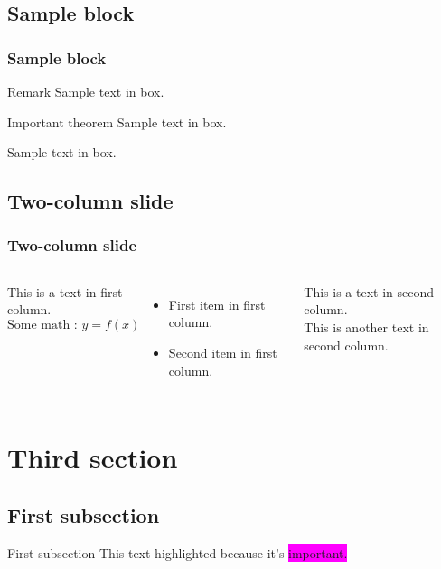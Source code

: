 \documentclass{beamer}
\begin{document}
\subsection{Sample block}
\begin{frame}
    \frametitle{Sample block}
    \begin{block}{Remark}
        Sample text in box.
    \end{block} 
        
    \begin{alertblock}{Important theorem}
        Sample text in box.
    \end{alertblock}
        
    \begin{examples}
        Sample text in box.
    \end{examples}
\end{frame}
    
\subsection{Two-column slide}
\begin{frame}
    \frametitle{Two-column slide}
    \begin{columns}
    This is a text in first column. \[\mbox{Some math : }y=f(x)\]
        \begin{itemize}
            \item First item in first column.
            \item Second item in first column.
        \end{itemize}
    
    This is a text in second column. \\
    This is another text in second column. 
    \end{columns}
\end{frame}




\section{Third section}
\subsection{First subsection}
\begin{frame}{First subsection}
    \alert{This text highlighted} because it's \colorbox{magenta}{important.}
\end{frame}
\end{document}
